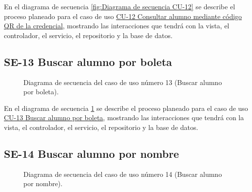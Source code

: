 En el diagrama de secuencia \ref{fig:Diagrama de secuencia CU-12} se describe el proceso planeado para el caso de uso \hyperlink{CU-12}{CU-12 Consultar alumno mediante código QR de la credencial}, mostrando las interacciones que tendrá con la vista, el controlador, el servicio, el repositorio y la base de datos.

\newpage

\subsection{SE-13 Buscar alumno por boleta}

\begin{figure}[htbp!]
	\begin{center}
		\caption{Diagrama de secuencia del caso de uso número 13 (Buscar alumno por boleta).}
		\label{fig:Diagrama de secuencia CU-13}
	\end{center}
\end{figure}

En el diagrama de secuencia \ref{fig:Diagrama de secuencia CU-13} se describe el proceso planeado para el caso de uso \hyperlink{CU-13}{CU-13 Buscar alumno por boleta}, mostrando las interacciones que tendrá con la vista, el controlador, el servicio, el repositorio y la base de datos.

\newpage

\subsection{SE-14 Buscar alumno por nombre}

\begin{figure}[htbp!]
	\begin{center}
		\caption{Diagrama de secuencia del caso de uso número 14 (Buscar alumno por nombre).}
		\label{fig:Diagrama de secuencia CU-14}
	\end{center}
\end{figure}


